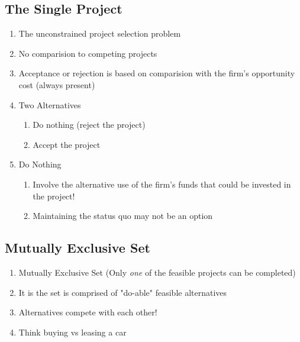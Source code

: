 \documentclass{report} %
\begin{document}
\subsection*{The Single Project}
\begin{enumerate}
    \item The unconstrained project selection problem
    \item No comparision to competing projects
    \item Acceptance or rejection is based on comparision with the firm's opportunity cost (always present)
    \item Two Alternatives
        \begin{enumerate}
            \item Do nothing (reject the project)
            \item Accept the project
        \end{enumerate}
    \item Do Nothing
        \begin{enumerate}
            \item Involve the alternative use of the firm's funds that could be invested in the project!
            \item Maintaining the status quo may not be an option
        \end{enumerate}
\end{enumerate}
\subsection*{Mutually Exclusive Set}
\begin{enumerate}
    \item Mutually Exclusive Set (Only \emph{one} of the feasible projects can be completed)
    \item It is the set is comprised of "do-able" feasible alternatives
    \item Alternatives compete with each other! 
    \item Think buying vs leasing a car
\end{enumerate}
\end{document}
